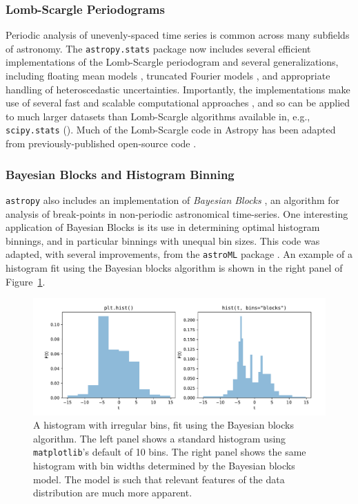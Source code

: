 \documentclass[modern]{aastex61}
\newcommand{\package}[1]{\texttt{#1}\xspace}
\newcommand{\astropy}{Astropy\xspace}
\newcommand{\astropypkg}{\package{astropy}}
\renewcommand{\figurename}{Figure\xspace}
\begin{document}
\subsubsection{Lomb-Scargle Periodograms}

Periodic analysis of unevenly-spaced time series is common across many subfields of astronomy. The \package{astropy.stats} package now includes several efficient implementations of the Lomb-Scargle periodogram \citep{Lomb76, Scargle82} and several generalizations, including floating mean models \citep{Zechmeister09}, truncated Fourier models \citep{Bretthorst2003}, and appropriate handling of heteroscedastic uncertainties. Importantly, the implementations make use of several fast and scalable computational approaches \citep[e.g.,][]{Press89, Palmer09}, and so can be applied to much larger datasets than Lomb-Scargle algorithms available in, e.g., \package{scipy.stats} (\citealt{scipy}). Much of the Lomb-Scargle code in \astropy has been adapted from previously-published open-source code \citep{astroML, VanderPlas2015}.

\subsubsection{Bayesian Blocks and Histogram Binning}
\astropypkg also includes an implementation of {\it Bayesian Blocks} \citep{Scargle2013}, an algorithm for analysis of break-points in non-periodic astronomical time-series. One interesting application of Bayesian Blocks is its use in determining optimal histogram binnings, and in particular binnings with unequal bin sizes. This code was adapted, with several improvements, from the \package{astroML} package \citep{astroML}. An example of a histogram fit using the Bayesian blocks algorithm is shown in the right panel of \figurename~\ref{fig:bayes-blocks-hist}.

\begin{figure}
\includegraphics[width=\textwidth]{bayesian_blocks_hist.pdf}
\caption{%
    A histogram with irregular bins, fit using the Bayesian blocks
    algorithm. The left panel shows a standard histogram using
    \package{matplotlib}'s default of 10 bins. The right panel shows
    the same histogram with bin widths determined by the Bayesian
    blocks model. The model is such that relevant features of the data
    distribution are much more apparent.
    \label{fig:bayes-blocks-hist}
}
\end{figure}
\end{document}
